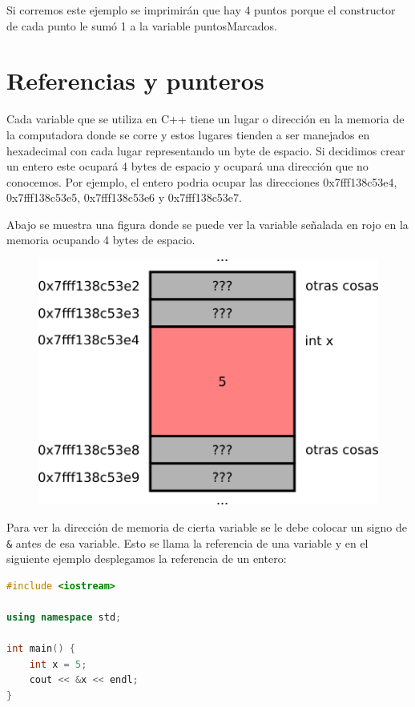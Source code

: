 \documentclass{article}
\begin{document}
Si corremos este ejemplo se imprimirán que hay 4 puntos porque el constructor de cada punto le sumó 1 a la variable puntosMarcados.

\section{Referencias y punteros}

Cada variable que se utiliza en C++ tiene un lugar o dirección en la memoria de la computadora donde se corre y estos lugares tienden a ser manejados en hexadecimal con cada lugar representando un byte de espacio. Si decidimos crear un entero este ocupará 4 bytes de espacio y ocupará una dirección que no conocemos. Por ejemplo, el entero podria ocupar las direcciones 0x7fff138c53e4, 0x7fff138c53e5, 0x7fff138c53e6 y 0x7fff138c53e7.

Abajo se muestra una figura donde se puede ver la variable señalada en rojo en la memoria ocupando 4 bytes de espacio.

\begin{figure}[H]
    \centering
    \includegraphics[width=0.4\paperwidth]{memoria}
\end{figure}

Para ver la dirección de memoria de cierta variable se le debe colocar un signo de \lstinline{&} antes de esa variable. Esto se llama la referencia de una variable y en el siguiente ejemplo desplegamos la referencia de un entero:

\begin{lstlisting}[language=C++, title=Referencias]
#include <iostream>

using namespace std;

int main() {
	int x = 5;
	cout << &x << endl;
}
\end{lstlisting}
\end{document}
